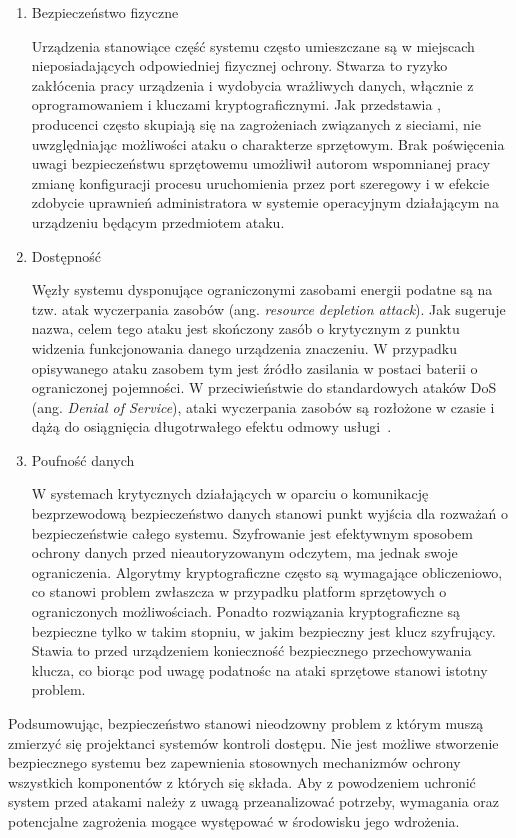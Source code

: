 		\begin{enumerate}[label=\Alph*.]
			\item Bezpieczeństwo fizyczne

				Urządzenia stanowiące część systemu często umieszczane są w miejscach nieposiadających odpowiedniej fizycznej ochrony. Stwarza to ryzyko zakłócenia pracy urządzenia i wydobycia wrażliwych danych, włącznie z oprogramowaniem i kluczami kryptograficznymi. Jak przedstawia \cite{iot-hardware-attack}, producenci często skupiają się na zagrożeniach związanych z sieciami, nie uwzględniając możliwości ataku o charakterze sprzętowym. Brak poświęcenia uwagi bezpieczeństwu sprzętowemu umożliwił autorom wspomnianej pracy zmianę konfiguracji procesu uruchomienia przez port szeregowy i w efekcie zdobycie uprawnień administratora w systemie operacyjnym działającym na urządzeniu będącym przedmiotem ataku.

			\item Dostępność

				Węzły systemu dysponujące ograniczonymi zasobami energii podatne są na tzw. atak wyczerpania zasobów (ang. \textit{resource depletion attack}). Jak sugeruje nazwa, celem tego ataku jest skończony zasób o krytycznym z punktu widzenia funkcjonowania danego urządzenia znaczeniu. W przypadku opisywanego ataku zasobem tym jest źródło zasilania w postaci baterii o ograniczonej pojemności. W przeciwieństwie do standardowych ataków DoS (ang. \textit{Denial of Service}), ataki wyczerpania zasobów są rozłożone w czasie i dążą do osiągnięcia długotrwałego efektu odmowy usługi~\cite{iot-rd-attack}.

			\item Poufność danych

				W systemach krytycznych działających w oparciu o komunikację bezprzewodową bezpieczeństwo danych stanowi punkt wyjścia dla rozważań o bezpieczeństwie całego systemu. Szyfrowanie jest efektywnym sposobem ochrony danych przed nieautoryzowanym odczytem, ma jednak swoje ograniczenia. Algorytmy kryptograficzne często są wymagające obliczeniowo, co stanowi problem zwłaszcza w przypadku platform sprzętowych o ograniczonych możliwościach. Ponadto rozwiązania kryptograficzne są bezpieczne tylko w takim stopniu, w jakim bezpieczny jest klucz szyfrujący. Stawia to przed urządzeniem konieczność bezpiecznego przechowywania klucza, co biorąc pod uwagę podatnośc na ataki sprzętowe stanowi istotny problem.

		\end{enumerate}

		Podsumowując, bezpieczeństwo stanowi nieodzowny problem z którym muszą zmierzyć się projektanci systemów kontroli dostępu. Nie jest możliwe stworzenie bezpiecznego systemu bez zapewnienia stosownych mechanizmów ochrony wszystkich komponentów z których się składa. Aby z powodzeniem uchronić system przed atakami należy z uwagą przeanalizować potrzeby, wymagania oraz potencjalne zagrożenia mogące występować w środowisku jego wdrożenia.